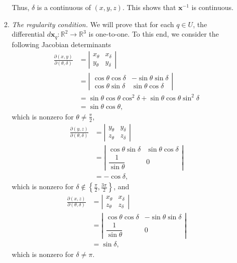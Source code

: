 \documentclass[a4paper]{article}
\numberwithin{equation}{section}
\begin{document}
\begin{enumerate}
\begin{enumerate}
Thus, $\delta$ is a continuous of $\left(x,y,z\right)$. This shows that $\mathbf{x}^{-1}$ is continuous. 
\item \textit{The regularity condition.} We will prove that for each $q \in U$, the differential $d\mathbf{x}_q: \mathbb{R}^2 \to \mathbb{R}^3$ is one-to-one. To this end, we consider the following Jacobian determinants
\begin{align}
\frac{{\partial \left( {x,y} \right)}}{{\partial \left( {\theta ,\delta } \right)}} &= \left| {\begin{array}{*{20}{c}}
{{x_\theta }}&{{x_\delta }}\\
{{y_\theta }}&{{y_\delta }}
\end{array}} \right|\\
& = \left| {\begin{array}{*{20}{c}}
{\cos \theta \cos \delta }&{ - \sin \theta \sin \delta }\\
{\cos \theta \sin \delta }&{\sin \theta \cos \delta }
\end{array}} \right|\\
& = \sin \theta \cos \theta {\cos ^2}\delta  + \sin \theta \cos \theta {\sin ^2}\delta \\
& = \sin \theta \cos \theta ,
\end{align}
which is nonzero for $\theta  \ne \frac{\pi }{2}$,
\begin{align}
\frac{{\partial \left( {y,z} \right)}}{{\partial \left( {\theta ,\delta } \right)}} &= \left| {\begin{array}{*{20}{c}}
{{y_\theta }}&{{y_\delta }}\\
{{z_\theta }}&{{z_\delta }}
\end{array}} \right|\\
& = \left| {\begin{array}{*{20}{c}}
{\cos \theta \sin \delta }&{\sin \theta \cos \delta }\\
{\dfrac{1}{{\sin \theta }}}&0
\end{array}} \right|\\
& =  - \cos \delta ,
\end{align}
which is nonzero for $\delta  \notin \left\{ {\frac{\pi }{2},\frac{{3\pi }}{2}} \right\}$, and 
\begin{align}
\frac{{\partial \left( {x,z} \right)}}{{\partial \left( {\theta ,\delta } \right)}} &= \left| {\begin{array}{*{20}{c}}
{{x_\theta }}&{{x_\delta }}\\
{{z_\theta }}&{{z_\delta }}
\end{array}} \right|\\
& = \left| {\begin{array}{*{20}{c}}
{\cos \theta \cos \delta }&{ - \sin \theta \sin \delta }\\
{\dfrac{1}{{\sin \theta }}}&0
\end{array}} \right|\\
&= \sin \delta ,
\end{align}
which is nonzero for $\delta \ne \pi$. 


\end{enumerate}
\end{enumerate}
\end{document}
